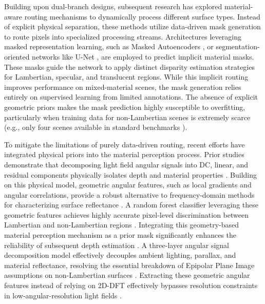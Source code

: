 \documentclass[lettersize,journal]{IEEEtran}
\begin{document}
Building upon dual-branch designs, subsequent research has explored material-aware routing mechanisms to dynamically process different surface types. Instead of explicit physical separation, these methods utilize data-driven mask generation to route pixels into specialized processing streams. Architectures leveraging masked representation learning, such as Masked Autoencoders \cite{he2022}, or segmentation-oriented networks like U-Net \cite{ronneberger2015}, are employed to predict implicit material masks. These masks guide the network to apply distinct disparity estimation strategies for Lambertian, specular, and translucent regions. While this implicit routing improves performance on mixed-material scenes, the mask generation relies entirely on supervised learning from limited annotations. The absence of explicit geometric priors makes the mask prediction highly susceptible to overfitting, particularly when training data for non-Lambertian scenes is extremely scarce (e.g., only four scenes available in standard benchmarks \cite{honauer2016}).

To mitigate the limitations of purely data-driven routing, recent efforts have integrated physical priors into the material perception process. Prior studies demonstrate that decomposing light field angular signals into DC, linear, and residual components physically isolates depth and material properties \cite{kieffer2013}. Building on this physical model, geometric angular features, such as local gradients and angular correlations, provide a robust alternative to frequency-domain methods for characterizing surface reflectance \cite{ng2006}. A random forest classifier leveraging these geometric features achieves highly accurate pixel-level discrimination between Lambertian and non-Lambertian regions \cite{wang2020}. Integrating this geometry-based material perception mechanism as a prior mask significantly enhances the reliability of subsequent depth estimation \cite{dong2021}. A three-layer angular signal decomposition model effectively decouples ambient lighting, parallax, and material reflectance, resolving the essential breakdown of Epipolar Plane Image assumptions on non-Lambertian surfaces \cite{pan2023}. Extracting these geometric angular features instead of relying on 2D-DFT effectively bypasses resolution constraints in low-angular-resolution light fields \cite{stauffer2021}.
\end{document}
